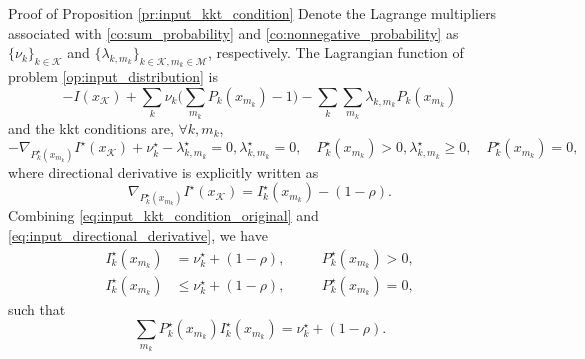 \documentclass[journal]{IEEEtran}
\begin{document}
\begin{appendix}
	\begin{subsection}{Proof of Proposition \ref{pr:input_kkt_condition}}
		Denote the Lagrange multipliers associated with \eqref{co:sum_probability} and \eqref{co:nonnegative_probability} as $\{\nu_k\}_{k \in \mathcal{K}}$ and $\{\lambda_{k,m_k}\}_{k \in \mathcal{K},m_k \in \mathcal{M}}$, respectively.
		The Lagrangian function of problem \eqref{op:input_distribution} is
		\begin{equation}
			- I(x_{\mathcal{K}}) + \sum_k \nu_k \biggl( \sum_{m_k} P_k(x_{m_k}) - 1 \biggr) - \sum_k \sum_{m_k} \lambda_{k,m_k} P_k(x_{m_k})
		\end{equation}
		and the \gls{kkt} conditions are, $\forall k,m_k$,
		\begin{subequations}
			\label{eq:input_kkt_condition_original}
			\begin{equation}
				- \nabla_{P_k^\star(x_{m_k})} I^\star(x_{\mathcal{K}}) + \nu_k^\star - \lambda_{k,m_k}^\star = 0,
			\end{equation}
			\begin{equation}
				\lambda_{k,m_k}^\star = 0, \quad P_k^\star(x_{m_k}) > 0,
			\end{equation}
			\begin{equation}
				\lambda_{k,m_k}^\star \ge 0, \quad P_k^\star(x_{m_k}) = 0,
			\end{equation}
		\end{subequations}
		where directional derivative is explicitly written as
		\begin{equation}
			\nabla_{P_k^\star(x_{m_k})} I^\star(x_{\mathcal{K}}) = I_k^\star(x_{m_k}) - (1 - \rho).
			\label{eq:input_directional_derivative}
		\end{equation}
		Combining \eqref{eq:input_kkt_condition_original} and \eqref{eq:input_directional_derivative}, we have
		\begin{subequations}
			\label{eq:input_kkt_condition_transformed}
			\begin{alignat}{2}
				I_k^\star(x_{m_k}) & = \nu_k^\star + (1 - \rho), \quad   &  & P_k^\star(x_{m_k}) > 0,\label{eq:probable_states_marginal} \\
				I_k^\star(x_{m_k}) & \le \nu_k^\star + (1 - \rho), \quad &  & P_k^\star(x_{m_k}) = 0,\label{eq:dropped_states_marginal}
			\end{alignat}
		\end{subequations}
		such that
		\begin{equation}
			\sum_{m_k} P_k^\star(x_{m_k}) I_k^\star(x_{m_k}) = \nu_k^\star + (1 - \rho).

\end{equation}
\end{subsection}
\end{appendix}
\end{document}
